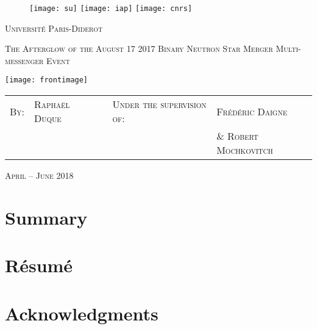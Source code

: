 
\begin{figure}[!htb]
  \texttt{[image: su]}
\endminipage\hfill
{}
  \texttt{[image: iap]}
\endminipage\hfill
{}%
  \texttt{[image: cnrs]}
\endminipage
\end{figure}

\begin{center}

{\LARGE \textsc{Université Paris-Diderot}}

\vspace{1cm}

{\LARGE \textsc{The Afterglow of the August 17 2017 Binary Neutron Star Merger Multi-messenger Event}}

\vspace{1cm}

\texttt{[image: frontimage]}

\vspace{2cm}

\begin{tabular}{p{0.7cm}p{3cm}p{3cm}p{5cm}p{5cm}}
\textsc{By:} & \textsc{Raphaël Duque} & & \textsc{Under the supervision of:} & \textsc{Frédéric Daigne} \\
             &                        & &                                   & \& \textsc{Robert Mochkovitch}
\end{tabular}
\vfill

\textsc{April -- June 2018}
\end{center}

\newpage

\section*{Summary}


\vfill

\section*{Résumé}

\newpage

\section*{Acknowledgments}
